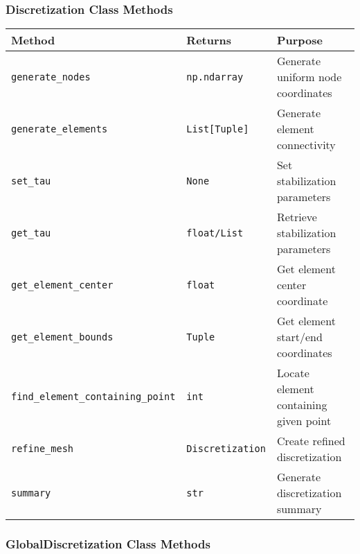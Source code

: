 \subsubsection{Discretization Class Methods}

\begin{longtable}{|p{4cm}|p{2cm}|p{7cm}|}
\hline
\textbf{Method} & \textbf{Returns} & \textbf{Purpose} \\
\hline
\endhead

\texttt{generate\_nodes} & \texttt{np.ndarray} & Generate uniform node coordinates \\
\hline

\texttt{generate\_elements} & \texttt{List[Tuple]} & Generate element connectivity \\
\hline

\texttt{set\_tau} & \texttt{None} & Set stabilization parameters \\
\hline

\texttt{get\_tau} & \texttt{float/List} & Retrieve stabilization parameters \\
\hline

\texttt{get\_element\_center} & \texttt{float} & Get element center coordinate \\
\hline

\texttt{get\_element\_bounds} & \texttt{Tuple} & Get element start/end coordinates \\
\hline

\texttt{find\_element\_containing\_point} & \texttt{int} & Locate element containing given point \\
\hline

\texttt{refine\_mesh} & \texttt{Discretization} & Create refined discretization \\
\hline

\texttt{summary} & \texttt{str} & Generate discretization summary \\
\hline

\end{longtable}

\subsubsection{GlobalDiscretization Class Methods}

